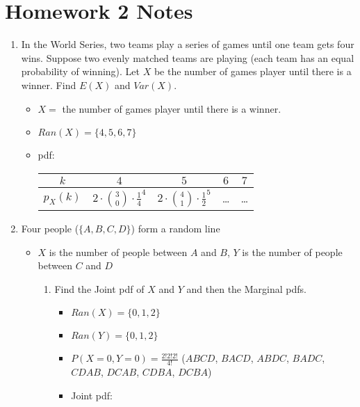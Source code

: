 \documentclass[12pt]{article}
\begin{document}
    \section{Homework 2 Notes}
        \begin{enumerate}
            \item In the World Series, two teams play a series of games until one team gets four wins. Suppose two evenly matched teams are playing (each team has an equal probability of winning). Let $X$ be the number of games player until there is a winner. Find $E(X)$ and $Var(X)$.
            \begin{itemize}
                \item $X = $ the number of games player until there is a winner.
                \item $Ran(X) = \{4, 5, 6, 7\}$
                \item pdf:
                \begin{tabular}{|c|c|c|c|c|}
                    \hline
                    $k$ & $4$ & $5$ & $6$ & $7$ \\
                    \hline
                    $p_X(k)$ & $2 \cdot \binom{3}{0} \cdot {\frac{1}{4}}^4$ & $2 \cdot \binom{4}{1} \cdot {\frac{1}{2}}^5$ & \ldots & \ldots \\
                    \hline
                \end{tabular}
            \end{itemize}
            \item Four people ($\{A, B, C, D\}$) form a random line
            \begin{itemize}
                \item $X$ is the number of people between $A$ and $B$, $Y$ is the number of people between $C$ and $D$
                \begin{enumerate}
                    \item Find the Joint pdf of $X$ and $Y$ and then the Marginal pdfs.
                    \begin{itemize}
                        \item $Ran(X) = \{0, 1, 2\}$
                        \item $Ran(Y) = \{0, 1, 2\}$
                        \item $P(X = 0, Y = 0) = \frac{2!2!2!}{4!}$ ($ABCD$, $BACD$, $ABDC$, $BADC$, $CDAB$, $DCAB$, $CDBA$, $DCBA$)
                        \item Joint pdf:
                        \begin{tabular}{|c|c|c|c|c|}

\end{tabular}
\end{itemize}
\end{enumerate}
\end{itemize}
\end{enumerate}
\end{document}
